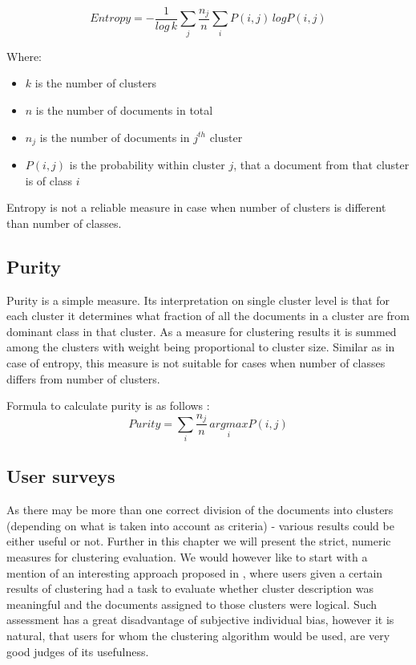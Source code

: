 \documentclass[a4paper, 12pt, oneside]{Thesis} %
\begin{document}
$$ Entropy = -\frac{1}{log\, k} \sum_j \frac{n_j}{n} \sum_i  P(i,j)\, log P(i,j) $$

Where:
\begin{itemize}
 \item $k$ is the number of clusters
 \item $n$ is the number of documents in total
 \item $n_j$ is the number of documents in $j^{th}$ cluster
 \item $P(i,j)$ is the probability within cluster $j$, that a document from that cluster is of class $i$
\end{itemize}

Entropy is not a reliable measure in case when number of clusters is different than number of classes.

\subsection{Purity} Purity is a simple measure. Its interpretation on single cluster level is that for each cluster it determines what fraction of all the documents in a cluster are from dominant class in that cluster. As a measure for clustering results it is summed among the clusters with weight being proportional to cluster size. Similar as in case of entropy, this measure is not suitable for cases when number of classes differs from number of clusters.

Formula to calculate purity is as follows \cite{andrews2007recent}:
$$ Purity = \sum_i  \frac{n_j}{n}\, \underset{i}{argmax} P(i,j)$$

\subsection{User surveys} As there may be more than one correct division of the documents into clusters (depending on what is taken into account as criteria) - various results could be either useful or not. Further in this chapter we will present the strict, numeric measures for clustering evaluation. We would however like to start with a mention of an interesting approach proposed in \cite{osinski2004lingo}, where users given a certain results of clustering had a task to evaluate whether cluster description was meaningful and the documents assigned to those clusters were logical. Such assessment has a great disadvantage of subjective individual bias, however it is natural, that users for whom the clustering algorithm would be used, are very good judges of its usefulness.
\end{document}
